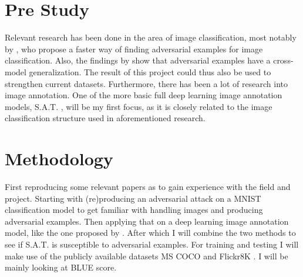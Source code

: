 \documentclass[12pt]{extarticle}
\begin{document}

\section{Pre Study}
Relevant research has been done in the area of image classification, most notably by \citeauthor{goodfellow2015explaining}, who propose a faster way of finding adversarial examples for image classification. Also, the findings by \citeauthor{venkatesh} show that adversarial examples have a cross-model generalization. The result of this project could thus also be used to strengthen current datasets. Furthermore, there has been a lot of research into image annotation. One of the more basic full deep learning image annotation models, S.A.T. \cite{xu2016show}, will be my first focus, as it is closely related to the image classification structure used in aforementioned research.

\section{Methodology}
First reproducing some relevant papers as to gain experience with the field and project. Starting with (re)producing an adversarial attack on a MNIST classification model \cite{szegedy2014intriguing} to get familiar with handling images and producing adversarial examples. Then applying that on a deep learning image annotation model, like the one proposed by \citeauthor{xu2016show}. After which I will combine the two methods to see if S.A.T. is susceptible to adversarial examples. For training and testing I will make use of the publicly available datasets MS COCO \cite{lin2015microsoft} and Flickr8K \cite{Flickr8k}. I will be mainly looking at BLUE \cite{papineni_roukos_ward_zhu_2001} score.
\end{document}
